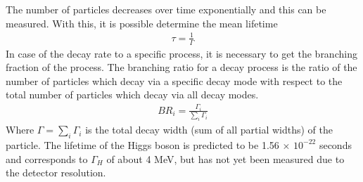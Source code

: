 
The number of particles decreases over time exponentially and this can be measured. With this, it is possible determine the mean lifetime\cite{griff}
\begin{align}
\tau=\frac{1}{\Gamma}
\end{align}
In case of the decay rate to a specific process, it is necessary to get the branching fraction of the process. 
The branching ratio for a decay process is the ratio of the number of particles which decay via a specific decay mode with respect to the total number of particles which decay via all decay modes.
\begin{align}
BR_i =\frac{\Gamma_i}{\sum_{i}\Gamma_i}
\end{align}
Where $\Gamma=\sum_i\Gamma_i$ is the total decay width (sum of all partial widths) of the particle.
The lifetime of the Higgs boson is predicted to be 1.56 $\times$ $10^{-22}$ seconds and corresponds to $\Gamma_H$ of about 4 MeV, but has not yet been measured due to the detector resolution\cite{cms-manual}.

